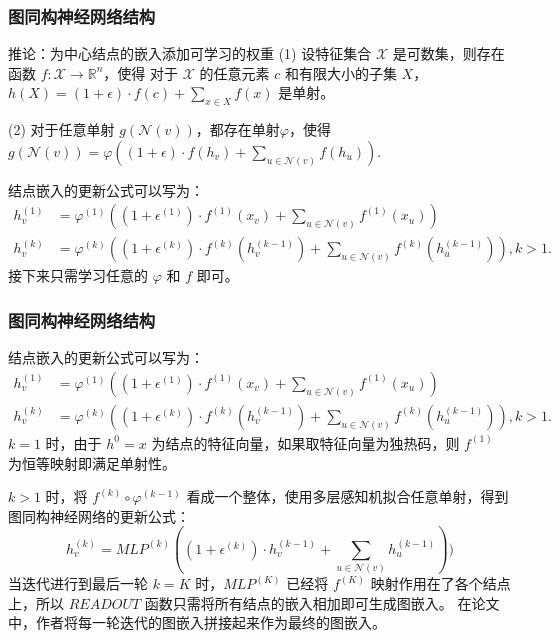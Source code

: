 \documentclass{beamer}
\begin{document}
\begin{frame}

  \frametitle{图同构神经网络结构}
  \begin{alertblock}{推论：为中心结点的嵌入添加可学习的权重}
    (1) 设特征集合 $\mathcal{X}$ 是可数集，则存在函数 $f: \mathcal{X} \rightarrow \mathbb{R}^n$，使得
    对于 $\mathcal{X}$ 的任意元素 $c$ 和有限大小的子集 $X$，$h(X) = (1 + \epsilon) \cdot f(c) + \sum_{x \in X} f(x)$ 是单射。
    
    (2) 对于任意单射 $g(\mathcal{N}(v))$，都存在单射$\varphi$，使得 $g(\mathcal{N}(v)) = \varphi((1 + \epsilon) \cdot f(h_v) + \sum_{u \in \mathcal{N}(v)} f(h_u))$.
  \end{alertblock}
  结点嵌入的更新公式可以写为：
  \begin{align*}
    h_v^{(1)} &= \varphi^{(1)}((1 + \epsilon^{(1)}) \cdot f^{(1)}(x_v) + \sum_{u \in \mathcal{N}(v)} f^{(1)}(x_u)) \\
    h_v^{(k)} &= \varphi^{(k)}((1 + \epsilon^{(k)}) \cdot f^{(k)}(h^{(k-1)}_v) + \sum_{u \in \mathcal{N}(v)} f^{(k)}(h^{(k-1)}_u)), k > 1.
  \end{align*}
  接下来只需学习任意的 $\varphi$ 和 $f$ 即可。

\end{frame}

\begin{frame}

  \frametitle{图同构神经网络结构}
  结点嵌入的更新公式可以写为：
  \begin{align*}
    h_v^{(1)} &= \varphi^{(1)}((1 + \epsilon^{(1)}) \cdot f^{(1)}(x_v) + \sum_{u \in \mathcal{N}(v)} f^{(1)}(x_u)) \\
    h_v^{(k)} &= \varphi^{(k)}((1 + \epsilon^{(k)}) \cdot f^{(k)}(h^{(k-1)}_v) + \sum_{u \in \mathcal{N}(v)} f^{(k)}(h^{(k-1)}_u)), k > 1.
  \end{align*}
  $k = 1$ 时，由于 $h^0 = x$ 为结点的特征向量，如果取特征向量为独热码，则 $f^{(1)}$ 为恒等映射即满足单射性。

  $k > 1$ 时，将 $f^{(k)} \circ \varphi^{(k-1)}$ 看成一个整体，使用多层感知机拟合任意单射，得到图同构神经网络的更新公式：
  $$
    h_v^{(k)} = MLP^{(k)} ((1 + \epsilon^{(k)}) \cdot h_v^{(k-1)} + \sum_{u \in \mathcal{N}(v)} h^{(k-1)}_u))
  $$
  当迭代进行到最后一轮 $k = K$ 时，$MLP^{(K)}$ 已经将 $f^{(K)}$ 映射作用在了各个结点上，所以 $READOUT$ 函数只需将所有结点的嵌入相加即可生成图嵌入。
  在论文中，作者将每一轮迭代的图嵌入拼接起来作为最终的图嵌入。
  

\end{frame}
\end{document}

